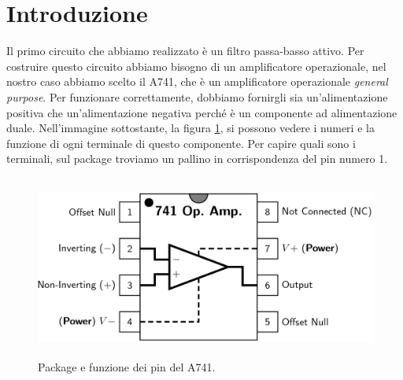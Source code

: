 \documentclass{report}
\begin{document}
\section{Introduzione}
Il primo circuito che abbiamo realizzato è un filtro passa-basso attivo. Per costruire questo circuito abbiamo bisogno di un amplificatore operazionale, nel nostro caso abbiamo scelto il \textmu A741, che è un amplificatore operazionale \textit{general purpose}. Per funzionare correttamente, dobbiamo fornirgli sia un'alimentazione positiva che un'alimentazione negativa perché è un componente ad alimentazione duale. Nell'immagine sottostante, la figura \ref{figura:741}, si possono vedere i numeri e la funzione di ogni terminale di questo componente. Per capire quali sono i terminali, sul package troviamo un pallino in corrispondenza del pin numero 1.  \par
\begin{figure}[h]
\centering
\includegraphics[height=6cm]{immagini/741pinout}
\caption{Package e funzione dei pin del \textmu A741.}
\label{figura:741}
\end{figure}
\end{document}

